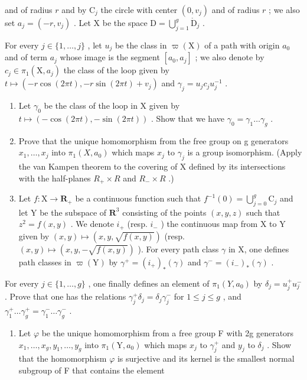 and of radius \(r\) and by \(\mathrm{C}_j\) the circle with center \((0,v_j)\) and of radius \(r\) ; we also set \(a_{j}=(-r,v_{j})\) . Let X be the space \(\mathrm{D}=\bigcup_{j=1}^{g}\mathring{\mathrm{D}}_{j}\) .

  For every \(j \in \{1, \ldots, j\}\) , let \(u_j\) be the class in \(\varpi(\mathrm{X})\) of a path with origin \(a_0\) and of term \(a_j\) whose image is the segment \([a_0, a_j]\) ; we also denote by \(c_j \in \pi_1(\mathrm{X}, a_j)\) the class of the loop given by \(t \mapsto (-r \cos(2\pi t), -r \sin(2\pi t) + v_j)\) and \(\gamma_j = u_j c_j u_j^{-1}\) .

\begin{enumerate}
\def\labelenumi{\alph{enumi})}
\item
  Let \(\gamma_{0}\) be the class of the loop in X given by \(t \mapsto (-\cos(2\pi t), -\sin(2\pi t))\) . Show that we have \(\gamma_{0} = \gamma_{1} \ldots \gamma_{g}\) .
\item
  Prove that the unique homomorphism from the free group on g generators \(x_{1},\ldots,x_{j}\) into \(\pi_{1}(X,a_{0})\) which maps \(x_{j}\) to \(\gamma_{j}\) is a group isomorphism. (Apply the van Kampen theorem to the covering of X defined by its intersections with the half-planes \(R_{+}\times R\) and \(R_{-}\times R\) .)
\item
  Let \(f \colon \mathrm{X} \to \mathbf{R}_+\) be a continuous function such that \(f^{-1}(0) = \bigcup_{j=0}^{g} \mathrm{C}_j\) and let Y be the subspace of \(\mathbf{R}^3\) consisting of the points \((x, y, z)\) such that \(z^2 = f(x, y)\) . We denote \(i_+\) (resp. \(i_-\) ) the continuous map from X to Y given by \((x, y) \mapsto (x, y, \sqrt{f(x, y)})\) (resp. \((x, y) \mapsto (x, y, -\sqrt{f(x, y)})\) ). For every path class \(\gamma\) in X, one defines path classes in \(\varpi(\mathrm{Y})\) by \(\gamma^+ = (i_+)_{*}(\gamma)\) and \(\gamma^- = (i_-)_*(\gamma)\) .
\end{enumerate}

For every \(j \in \{1, \ldots, g\}\) , one finally defines an element of \(\pi_1(Y, a_0)\) by \(\delta_j = u_j^+ u_j^-\) . Prove that one has the relations \(\gamma_j^+ \delta_j = \delta_j \gamma_j^-\) for \(1 \leqslant j \leqslant g\) , and \(\gamma_1^+ \ldots \gamma_g^+ = \gamma_1^- \ldots \gamma_g^-\) .

\begin{enumerate}
\def\labelenumi{\alph{enumi})}
\setcounter{enumi}{3}
\tightlist
\item
  Let \(\varphi\) be the unique homomorphism from a free group F with 2g generators \(x_{1},\ldots ,x_{g},y_{1},\ldots ,y_{g}\) into \(\pi_1(\mathrm{Y},a_0)\) which maps \(x_{j}\) to \(\gamma_j^+\) and \(y_{j}\) to \(\delta_{j}\) . Show that the homomorphism \(\varphi\) is surjective and its kernel is the smallest normal subgroup of F that contains the element
\end{enumerate}

